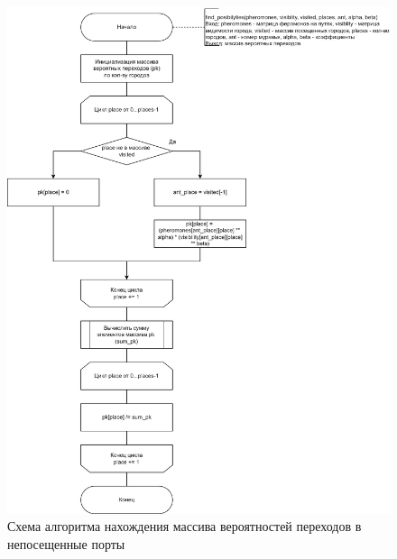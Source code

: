 \begin{figure}[h]
	\centering
	\includegraphics[height=0.9\textheight]{img/find-pos.png}
	\caption{Схема алгоритма нахождения массива вероятностей переходов в непосещенные порты}
	\label{fig:find-pos}
\end{figure}

